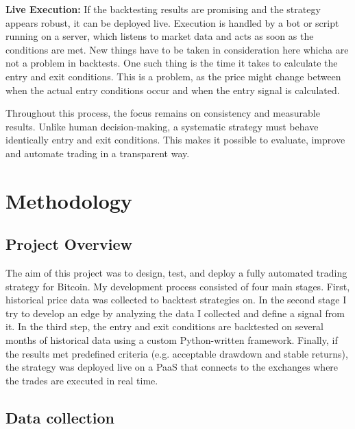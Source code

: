 \documentclass[12pt]{article}
\begin{document}
\textbf{Live Execution:}
If the backtesting results are promising and the strategy appears robust, it can be deployed live. Execution is handled by a bot or script running on a server, which listens to market data and acts as soon as the conditions are met. New things have to be taken in consideration here whicha are not a problem in backtests. One such thing is the time it takes to calculate the entry and exit conditions. This is a problem, as the price might change between when the actual entry conditions occur and when the entry signal is calculated.

Throughout this process, the focus remains on consistency and measurable results. Unlike human decision-making, a systematic strategy must behave identically entry and exit conditions. This makes it possible to evaluate, improve and automate trading in a transparent way.











\newpage
\section{Methodology}

\subsection*{Project Overview}
The aim of this project was to design, test, and deploy a fully automated trading strategy for Bitcoin.
My development process consisted of four main stages. First, historical price data was collected to backtest strategies on.
In the second stage I try to develop an edge by analyzing the data I collected and define a signal from it.
In the third step, the entry and exit conditions are backtested on several months of historical data using a custom Python-written framework. Finally, if the results met predefined criteria (e.g. acceptable drawdown and stable returns), the strategy was deployed live on a PaaS that connects to the exchanges where the trades are executed in real time.

\subsection*{Data collection}

\end{document}
